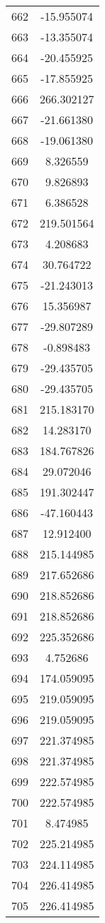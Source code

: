 \documentclass[12pt]{article}
\begin{document}
\begin{longtable}{@{}cc@{}}
662 & -15.955074 \\
663 & -13.355074 \\
664 & -20.455925 \\
665 & -17.855925 \\
666 & 266.302127 \\
667 & -21.661380 \\
668 & -19.061380 \\
669 & 8.326559 \\
670 & 9.826893 \\
671 & 6.386528 \\
672 & 219.501564 \\
673 & 4.208683 \\
674 & 30.764722 \\
675 & -21.243013 \\
676 & 15.356987 \\
677 & -29.807289 \\
678 & -0.898483 \\
679 & -29.435705 \\
680 & -29.435705 \\
681 & 215.183170 \\
682 & 14.283170 \\
683 & 184.767826 \\
684 & 29.072046 \\
685 & 191.302447 \\
686 & -47.160443 \\
687 & 12.912400 \\
688 & 215.144985 \\
689 & 217.652686 \\
690 & 218.852686 \\
691 & 218.852686 \\
692 & 225.352686 \\
693 & 4.752686 \\
694 & 174.059095 \\
695 & 219.059095 \\
696 & 219.059095 \\
697 & 221.374985 \\
698 & 221.374985 \\
699 & 222.574985 \\
700 & 222.574985 \\
701 & 8.474985 \\
702 & 225.214985 \\
703 & 224.114985 \\
704 & 226.414985 \\
705 & 226.414985 \\

\end{longtable}
\end{document}
